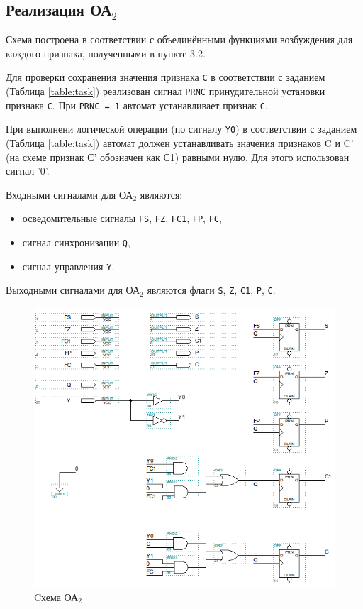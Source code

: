 \clearpage
\subsection{Реализация ОА${}_2$}

Схема построена в соответствии с объединёнными функциями возбуждения для каждого признака, полученными в пункте 3.2.

Для проверки сохранения значения признака \texttt{C} в соответствии с заданием (Таблица \ref{table:task}) реализован сигнал \texttt{PRNC} принудительной установки признака \texttt{С}. При \texttt{PRNC = 1} автомат устанавливает признак \texttt{C}.

При выполнени логической операции (по сигналу \texttt{Y0}) в соответствии с заданием (Таблица \ref{table:task}) автомат должен устанавливать значения признаков C и C' (на схеме признак С' обозначен как С1) равными нулю. Для этого использован сигнал '0'.

Входными сигналами для ОА${}_2$ являются:
\begin{itemize}
	\item осведомительные сигналы \texttt{FS}, \texttt{FZ}, \texttt{FC1}, \texttt{FP}, \texttt{FC},
	\item сигнал синхронизации \texttt{Q},
	\item сигнал управления \texttt{Y}.
\end{itemize}

Выходными сигналами для ОА${}_2$ являются флаги \texttt{S}, \texttt{Z}, \texttt{C1}, \texttt{P}, \texttt{C}.

\begin{figure}[H]
	\includegraphics[scale=0.6]{images/altera/rev2/OA2_PRNC/OA2_PRNC_WIDE.png}
	\caption{Cхема ОА$_{2}$}
	\label{figure:oa2log}
\end{figure}

